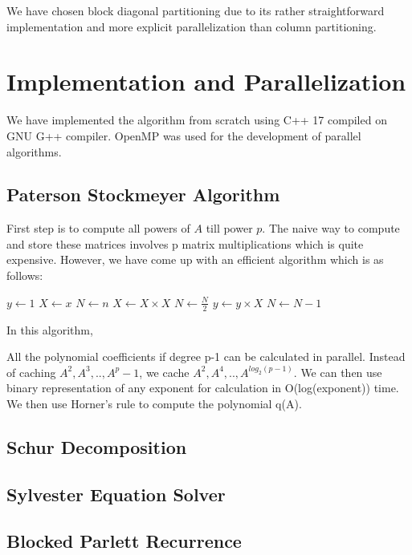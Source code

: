 \documentclass[12pt,a4paper]{article}
\begin{document}
We have chosen block diagonal partitioning due to its rather straightforward implementation and more explicit parallelization than column partitioning.

\newpage
\section{Implementation and Parallelization}
We have implemented the algorithm from scratch using C++ 17 compiled on GNU G++ compiler. OpenMP was used for the development of parallel algorithms. 

\subsection{Paterson Stockmeyer Algorithm}
First step is to compute all powers of $A$ till power $p$. The naive way to compute and store these matrices involves p matrix multiplications which is quite expensive. However, we have come up with an efficient algorithm which is as follows:
\begin{algorithm}
\caption{}\label{alg:cap}
\begin{algorithmic}
\State $y \gets 1$
\State $X \gets x$
\State $N \gets n$
    \State $X \gets X \times X$
    \State $N \gets \frac{N}{2}$  
    \State $y \gets y \times X$
    \State $N \gets N - 1$
\EndIf
\EndWhile
\end{algorithmic}
\end{algorithm}
In this algorithm, 



All the polynomial coefficients if degree p-1 can be calculated in parallel. Instead of caching $A^2,A^3,..,A^p-1$, we cache $A^2,A^4,..,A^{log_2(p-1)}$. We can then use binary representation of any exponent for calculation in O(log(exponent)) time. We then use Horner's rule to compute the polynomial q(A).


\subsection{Schur Decomposition}

\subsection{Sylvester Equation Solver}

\subsection{Blocked Parlett Recurrence}
\end{document}
